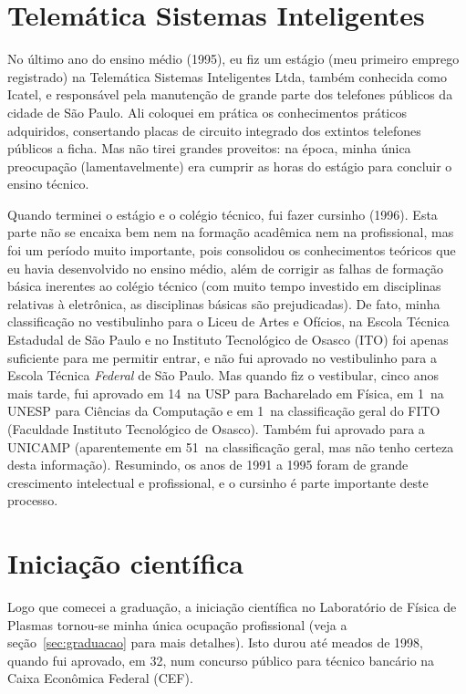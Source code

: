 \section{Telemática Sistemas Inteligentes}

No último ano do ensino médio (1995), eu fiz um estágio (meu primeiro emprego registrado) na Telemática Sistemas Inteligentes Ltda, também conhecida como Icatel, e responsável pela manutenção de grande parte dos telefones públicos da cidade de São Paulo. Ali coloquei em prática os conhecimentos práticos adquiridos, consertando placas de circuito integrado dos extintos telefones públicos a ficha. Mas não tirei grandes proveitos: na época, minha única preocupação (lamentavelmente) era cumprir as horas do estágio para concluir o ensino técnico.

Quando terminei o estágio e o colégio técnico, fui fazer cursinho (1996). Esta parte não se encaixa bem nem na formação acadêmica nem na profissional, mas foi um período muito importante, pois consolidou os conhecimentos teóricos que eu havia desenvolvido no ensino médio, além de corrigir as falhas de formação básica inerentes ao colégio técnico (com muito tempo investido em disciplinas relativas à eletrônica, as disciplinas básicas são prejudicadas). De fato, minha classificação no vestibulinho para o Liceu de Artes e Ofícios, na Escola Técnica Estadudal de São Paulo e no Instituto Tecnológico de Osasco (ITO) foi apenas suficiente para me permitir entrar, e não fui aprovado no vestibulinho para a Escola Técnica \emph{Federal} de São Paulo. Mas quando fiz o vestibular, cinco anos mais tarde, fui aprovado em 14\textordmasculine\ na USP para Bacharelado em Física, em 1\textordmasculine\ na UNESP para Ciências da Computação e em 1\textordmasculine\ na classificação geral do FITO (Faculdade Instituto Tecnológico de Osasco). Também fui aprovado  para a UNICAMP (aparentemente em 51\textordmasculine\ na classificação geral, mas não tenho certeza desta informação). Resumindo, os anos de 1991 a 1995 foram de grande crescimento intelectual e profissional, e o cursinho é parte importante deste processo.

\section{Iniciação científica}

Logo que comecei a graduação, a iniciação científica no Laboratório de Física de Plasmas tornou-se minha única ocupação profissional (veja a seção~\ref{sec:graduacao} para mais detalhes). Isto durou até meados de 1998, quando fui aprovado, em 32\textordmasculine, num concurso público para técnico bancário na Caixa Econômica Federal (CEF).

